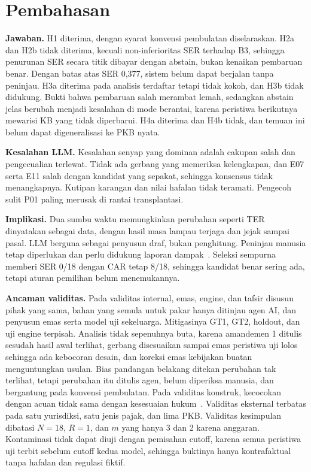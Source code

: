 \documentclass[conference]{IEEEtran}
\makeatletter
\DeclareRobustCommand{\en}[1]{{\usefont{\f@encoding}{\f@family}{\f@series}{it}#1\/}}
\makeatother
\begin{document}
\section{Pembahasan}
\label{sec:pembahasan}
\textbf{Jawaban.} H1 diterima, dengan syarat konvensi pembulatan diselaraskan. H2a dan H2b tidak diterima, kecuali non-inferioritas SER terhadap B3, sehingga penurunan SER secara titik dibayar dengan \en{abstain}, bukan kenaikan pembaruan benar. Dengan batas atas SER 0,377, sistem belum dapat berjalan tanpa peninjau. H3a diterima pada analisis terdaftar tetapi tidak kokoh, dan H3b tidak didukung. Bukti bahwa pembaruan salah merambat lemah, sedangkan \en{abstain} jelas berubah menjadi kesalahan di mode berantai, karena peristiwa berikutnya mewarisi KB yang tidak diperbarui. H4a diterima dan H4b tidak, dan temuan ini belum dapat digeneralisasi ke PKB nyata.

\textbf{Kesalahan LLM.} Kesalahan senyap yang dominan adalah cakupan salah dan pengecualian terlewat. Tidak ada gerbang yang memeriksa kelengkapan, dan E07 serta E11 salah dengan kandidat yang sepakat, sehingga konsensus tidak menangkapnya. Kutipan karangan dan nilai hafalan tidak teramati. Pengecoh sulit P01 paling merusak di rantai transplantasi.

\textbf{Implikasi.} Dua sumbu waktu memungkinkan perubahan seperti TER dinyatakan sebagai data, dengan hasil masa lampau terjaga dan jejak sampai pasal. LLM berguna sebagai penyusun draf, bukan penghitung. Peninjau manusia tetap diperlukan dan perlu didukung laporan dampak~\cite{enqvist2023oversight}. Seleksi sempurna memberi SER 0/18 dengan CAR tetap 8/18, sehingga kandidat benar sering ada, tetapi aturan pemilihan belum menemukannya.

\textbf{Ancaman validitas.} Pada validitas internal, emas, \en{engine}, dan tafsir disusun pihak yang sama, bahan yang semula untuk pakar hanya ditinjau agen AI, dan penyusun emas serta model uji sekeluarga. Mitigasinya GT1, GT2, \en{holdout}, dan uji \en{engine} terpisah. Analisis tidak sepenuhnya buta, karena amandemen 1 ditulis sesudah hasil awal terlihat, gerbang disesuaikan sampai emas peristiwa uji lolos sehingga ada kebocoran desain, dan koreksi emas kebijakan buatan menguntungkan usulan. Bias pandangan belakang ditekan perubahan tak terlihat, tetapi perubahan itu ditulis agen, belum diperiksa manusia, dan bergantung pada konvensi pembulatan. Pada validitas konstruk, kecocokan dengan acuan tidak sama dengan kesesuaian hukum~\cite{witt2024encoding}. Validitas eksternal terbatas pada satu yurisdiksi, satu jenis pajak, dan lima PKB. Validitas kesimpulan dibatasi $N = 18$, $R = 1$, dan $m$ yang hanya 3 dan 2 karena anggaran. Kontaminasi tidak dapat diuji dengan pemisahan \en{cutoff}, karena semua peristiwa uji terbit sebelum \en{cutoff} kedua model, sehingga buktinya hanya kontrafaktual tanpa hafalan dan regulasi fiktif.
\end{document}
